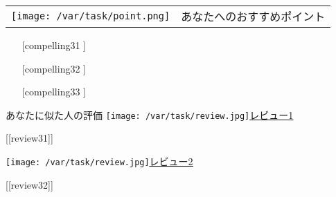 \documentclass[lualatex,paper=a4,airticle]{jlreq}
\begin{document}
\begin{minipage}[t][0.43\textheight][t]{\textwidth}
\begin{multicols}{2}
    \hspace{-2.3cm} %
    \begin{minipage}{1.25\columnwidth}
      \vspace{-0.4cm}
      \begin{itembox}[l]{
        \begin{tabular}{@{}m{9mm}@{}m{6cm}}
          \texttt{[image: /var/task/point.png]} & \gtfamily\ebseries\large あなたへのおすすめポイント
        \end{tabular}
      }
        \vspace{-1\baselineskip}
        \begin{itemize}
          \setlength{\itemindent}{-10pt}
          \item [[compelling31]]
          \item [[compelling32]]
          \item [[compelling33]]
        \end{itemize}
      \end{itembox}
    \end{minipage}


    \hspace{-2.3cm} %
    \begin{minipage}{1.25\columnwidth}
      \begin{itembox}[l]{{\gtfamily\ebseries\large あなたに似た人の評価}}
        \vspace{-3mm}
        \texttt{[image: /var/task/review.jpg]}\href{[[review_url31]]}{\color{blue}\underline{レビュー1}}\par
        \begin{spacing}{0.5}
          {\small [[review31]]}\par
        \end{spacing}
        \vspace{2mm}
        \texttt{[image: /var/task/review.jpg]}\href{[[review_url32]]}{\color{blue}\underline{レビュー2}}\par
        \begin{spacing}{0.5}
          {\small [[review32]]}\par
        \end{spacing}
        \vspace{2mm}
      \end{itembox}
    \end{minipage}

  \end{multicols}
\end{minipage}
\end{document}
